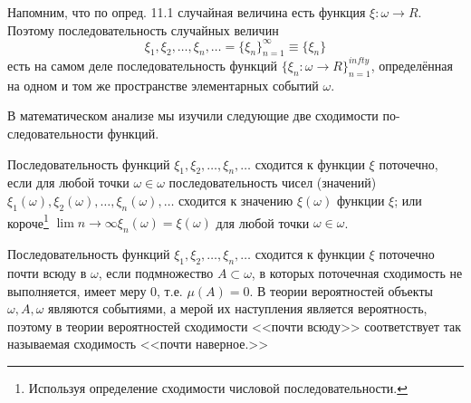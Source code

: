\begin{remark}\label{rem:21.1}
Напомним, что по опред. 11.1 случайная величина
есть функция $ \xi : \omega \to R$. Поэтому последовательность случайных величин
$$\xi_1, \xi_2,\dots, \xi_n,\dots = \{\xi_n\}_{n=1}^{\infty}\equiv\{\xi_n\}$$
есть на самом деле последовательность функций $\{\xi_n : \omega \to R\}_{n=1}^{infty}$, определённая на одном и том же пространстве элементарных событий $\omega$.
\end{remark}
В математическом анализе мы изучили следующие две сходимости по-
следовательности функций.

\begin{definition}
	Последовательность функций $\xi_1, \xi_2,\dots , \xi_n,\dots$ сходится к функции $\xi$ поточечно, если для любой точки $\omega \in \omega$ последовательность чисел (значений) $\xi_1(\omega), \xi_2(\omega),\dots, \xi_n(\omega),\dots$ сходится к значению $\xi(\omega)$ функции $\xi$; или короче\footnote{Используя определение сходимости числовой последовательности.} $\lim\limits{n\to\infty}\xi_n(\omega) = \xi(\omega)$
	для любой точки $\omega \in \omega$.
\end{definition}

\begin{definition}
	Последовательность функций $\xi_1, \xi_2,\dots, \xi_n,\dots$ сходится к функции $\xi$ поточечно почти всюду в $\omega$, если подмножество $A \subset
\omega$, в которых поточечная сходимость не выполняется, имеет меру 0, т.е.
$\mu(A) = 0$.
В теории вероятностей объекты $\omega, A, \omega$ являются событиями, а мерой
их наступления является вероятность, поэтому в теории вероятностей
сходимости <<почти всюду>> соответствует так называемая сходимость
<<почти наверное.>>
\end{definition}

